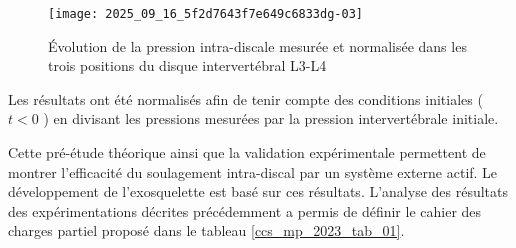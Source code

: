 
\begin{figure}[!h]
\centering
\texttt{[image: 2025\_09\_16\_5f2d7643f7e649c6833dg-03]}
\caption{\label{ccs_mp_2023_fig_04}  Évolution de la pression intra-discale mesurée et normalisée dans les trois positions du disque intervertébral L3-L4}
\end{figure}



Les résultats ont été normalisés afin de tenir compte des conditions initiales ( $t<0$ ) en divisant les pressions mesurées par la pression intervertébrale initiale.\\

\ifprof
\begin{corrige}
\end{corrige}
\else
\fi


Cette pré-étude théorique ainsi que la validation expérimentale permettent de montrer l'efficacité du soulagement intra-discal par un système externe actif. Le développement de l'exosquelette est basé sur ces résultats. L'analyse des résultats des expérimentations décrites précédemment a permis de définir le cahier des charges partiel proposé dans le tableau \ref{ccs_mp_2023_tab_01}.


